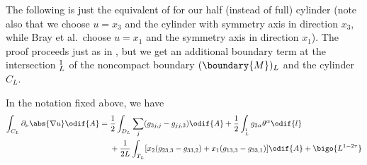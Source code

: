 \documentclass[titlepage,numbers=noenddot,oneside,%
cleardoublepage=empty,paper=a4,fontsize=11pt,%
english,%
]{scrartcl}
\let\sphere\relax
\newcommand{\sphere}{\mathbb{S}}
\begin{document}
The following is just the equivalent of \cite[Lemma 6.1]{brayHarmonicFunctionsMass2019} for our half (instead of full) cylinder (note also that we choose \( u=x_3 \) and the cylinder with symmetry axis in direction \( x_3 \), while Bray et al.~choose \( u=x_1 \) and the symmetry axis in direction \( x_1 \)). The proof proceeds just as in \cite[Lemma 6.1]{brayHarmonicFunctionsMass2019}, but we get an additional boundary term at the intersection \( \sphere^1_L \) of the noncompact boundary \( (\boundary{M})_L \) and the cylinder \( C_L \).
\begin{lemma}\label{lem:cylinder_boundary_term}
    In the notation fixed above, we have
    \begin{equation}\label{eq:cylinder_boundary_term_standard}
        \int_{C_L} \partial_\nu\abs{\nabla u}\odif{A}=\begin{aligned}[t]            &\frac{1}{2}\int_{D_L}\sum_{j}(g_{3j,j}-g_{jj,3})\odif{A}+\frac{1}{2}\int_{\sphere^1_L}g_{3\alpha}\theta^\alpha\odif{l}\\
            &+\frac{1}{2L}\int_{T_L}[x_2(g_{23,3}-g_{33,2})+x_1  (g_{13,3}-g_{33,1})]\odif{A}+\bigo{L^{1-2\tau}}
        \end{aligned}
    \end{equation}
\end{lemma}
\end{document}
